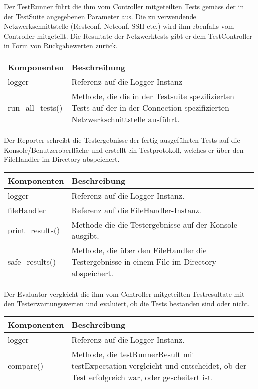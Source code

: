 \documentclass[]{subfiles}
\begin{document}
	Der TestRunner führt die ihm vom Controller mitgeteilten Tests gemäss der in der TestSuite angegebenen Parameter aus. 
	Die zu verwendende Netzwerkschnittstelle (Restconf, Netconf, SSH etc.) wird ihm ebenfalls vom Controller mitgeteilt.
	Die Resultate der Netzwerktests gibt er dem TestController in Form von Rückgabewerten zurück.

	\begin{tabularx}{\textwidth}{lX}
		\toprule
			Komponenten & Beschreibung \\
		\midrule
			logger & Referenz auf die Logger-Instanz \\ 
		\midrule
			run\_all\_tests() & Methode, die die in der Testsuite spezifizierten Tests auf der in der Connection spezifizierten Netzwerkschnittstelle ausführt. \\
		\bottomrule
	\end{tabularx}
	\newpage

	Der Reporter schreibt die Testergebnisse der fertig ausgeführten Tests auf die Konsole/Benutzeroberfläche und erstellt ein Testprotokoll, welches er über den FileHandler im Directory abspeichert.

	\begin{tabularx}{\textwidth}{lX}
		\toprule
			Komponenten & Beschreibung \\
		\midrule
			logger & Referenz auf die Logger-Instanz. \\
			fileHandler & Referenz auf die FileHandler-Instanz. \\	
		\midrule
			print\_results() & Methode die die Testergebnisse auf der Konsole ausgibt. \\
			safe\_results() & Methode, die über den FileHandler die Testergebnisse in einem File im Directory abspeichert. \\
		\bottomrule
	\end{tabularx}

	Der Evaluator vergleicht die ihm vom Controller mitgeteilten Testresultate mit den Testerwartungswerten und evaluiert, ob die Tests bestanden sind oder nicht.

	\begin{tabularx}{\textwidth}{lX}
		\toprule
			Komponenten & Beschreibung \\
		\midrule
			logger & Referenz auf die Logger-Instanz. \\
		\midrule
			compare() & Methode, die testRunnerResult mit testExpectation vergleicht und entscheidet, ob der Test erfolgreich war, oder gescheitert ist. \\
		\bottomrule
	\end{tabularx}
	\newpage
\end{document}
